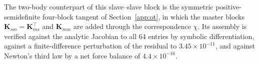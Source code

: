 \documentclass{svjour3}                 %
\begin{document}
\begin{appendix}
The two-body counterpart of this slave--slave block is the symmetric positive-semidefinite four-block
tangent of Section~\ref{app:ot}, in which the master blocks $\bm K_{sm}=\bm K_{ms}^{\top}$ and $\bm K_{mm}$
are added through the correspondence $\chi$. Its assembly is verified against the analytic Jacobian to all
$64$ entries by symbolic differentiation, against a finite-difference perturbation of the residual to
$3.45\times10^{-11}$, and against Newton's third law by a net force balance of $4.4\times10^{-16}$.

\end{appendix}



\end{document}
